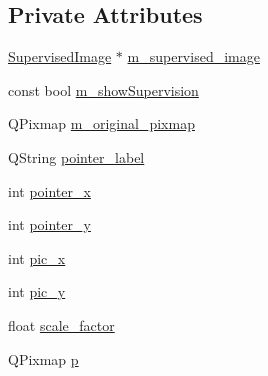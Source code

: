 \subsection*{Private Attributes}
\begin{DoxyCompactItemize}
\item 
\hyperlink{class_supervised_image}{Supervised\+Image} $\ast$ \hyperlink{class_supervised_image_viewer_widget_a9b18750bcbbca455f8436b6fa5910358}{m\+\_\+supervised\+\_\+image}
\item 
const bool \hyperlink{class_supervised_image_viewer_widget_a55d4f963434258710973e838dca00c69}{m\+\_\+show\+Supervision}
\item 
Q\+Pixmap \hyperlink{class_supervised_image_viewer_widget_abac9700eb9abd3a3783315c66592b132}{m\+\_\+original\+\_\+pixmap}
\item 
Q\+String \hyperlink{class_supervised_image_viewer_widget_a5b6b90406bcafc5cf4fc9bd1699b6ae2}{pointer\+\_\+label}
\item 
int \hyperlink{class_supervised_image_viewer_widget_aa5a248e17acf9c77c429b4100c13bcd0}{pointer\+\_\+x}
\item 
int \hyperlink{class_supervised_image_viewer_widget_a421d544fb8e23c662c55c5526b9d33fc}{pointer\+\_\+y}
\item 
int \hyperlink{class_supervised_image_viewer_widget_adaa30022724c053ff4e36550bc22e0f5}{pic\+\_\+x}
\item 
int \hyperlink{class_supervised_image_viewer_widget_a13bbd51489a6492d16b43de22e20d2e7}{pic\+\_\+y}
\item 
float \hyperlink{class_supervised_image_viewer_widget_a3f8c945a473a9840c5d76615422f02ac}{scale\+\_\+factor}
\item 
Q\+Pixmap \hyperlink{class_supervised_image_viewer_widget_aa06bb70314d2ac9c24d2735c8c6dce4c}{p}
\end{DoxyCompactItemize}


